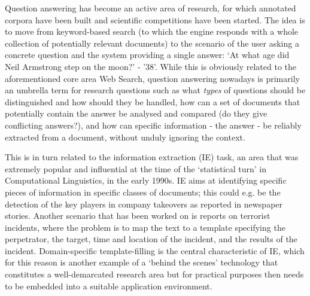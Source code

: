 \begin{multicols}{2}
Question answering has become an active area of research, for which annotated corpora have been built and scientific competitions have been started. The idea is to move from keyword-based search (to which the engine responds with a whole collection of potentially relevant documents) to the scenario of the user asking a concrete question and the system providing a single answer: ‘At what age did Neil Armstrong step on the moon?’ - ’38’. While this is obviously related to the aforementioned core area Web Search, question answering nowadays is primarily an umbrella term for research questions such as what \textit{types} of questions should be distinguished and how should they be handled, how can a set of documents that potentially contain the answer be analysed and compared (do they give conflicting answers?), and how can specific information - the answer - be reliably extracted from a document, without unduly ignoring the context. 


This is in turn related to the information extraction (IE) task, an area that was extremely popular and influential at the time of the ‘statistical turn’ in Computational Linguistics, in the early 1990s. IE aims at identifying specific pieces of information in specific classes of documents; this could e.g. be the detection of the key players in company takeovers as reported in newspaper stories. Another scenario that has been worked on is reports on terrorist incidents, where the problem is to map the text to a template specifying the perpetrator, the target, time and location of the incident, and the results of the incident. Domain-specific template-filling is the central characteristic of IE, which for this reason is another example of a ‘behind the scenes’ technology that constitutes a well-demarcated research area but for practical purposes then needs to be embedded into a suitable application environment. 


\end{multicols}
